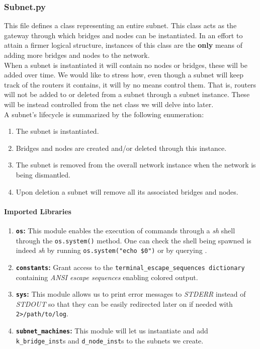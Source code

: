 \subsubsection{Subnet.py}
    This file defines a class representing an entire subnet. This class acts as the gateway through which bridges and nodes can be instantiated. In an effort to attain a firmer logical structure, instances of this class are the \textbf{only} means of adding more bridges and nodes to the network.\\

    When a subnet is instantiated it will contain no nodes or bridges, these will be added over time. We would like to stress how, even though a subnet will keep track of the routers it contains, it will by no means control them. That is, routers will not be added to or deleted from a subnet through a subnet instance. These will be instead controlled from the net class we will delve into later.\\

    A subnet's lifecycle is summarized by the following enumeration:\\

    \begin{enumerate}
        \item The subnet is instantiated.
        \item Bridges and nodes are created and/or deleted through this instance.
        \item The subnet is removed from the overall network instance when the network is being dismantled.
        \item Upon deletion a subnet will remove all its associated bridges and nodes.
    \end{enumerate}

    \paragraph{Imported Libraries}
        \begin{enumerate}
            \item \textbf{\texttt{os}:} This module enables the execution of commands through a \textit{sh} shell through the \texttt{os.system()} method. One can check the shell being spawned is indeed \textit{sh} by running \texttt{\allowbreak os.system("echo \$0")} or by querying \cite{bib:man-system}.
            \item \textbf{\texttt{constants}:} Grant access to the \texttt{\allowbreak terminal\_escape\_sequences dictionary} containing \textit{ANSI escape sequences} enabling colored output.
            \item \textbf{\texttt{sys}:} This module allows us to print error messages to \textit{STDERR} instead of \textit{STDOUT} so that they can be easily redirected later on if needed with \texttt{2>/path/to/log}.
            \item \textbf{\texttt{subnet\_machines}:} This module will let us instantiate and add \texttt{k\_bridge\_inst}s and \texttt{d\_node\_inst}s to the subnets we create.
        \end{enumerate}


